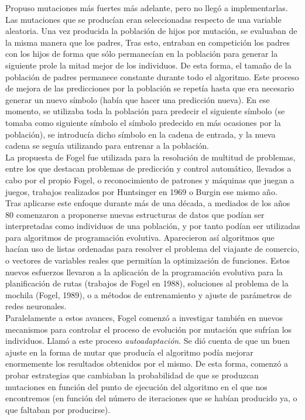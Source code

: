 \documentclass[12pt]{article} \usepackage[utf8]{inputenc}
\begin{document}
Propuso mutaciones más fuertes más adelante, pero no llegó a
implementarlas. Las mutaciones que se producían eran seleccionadas
respecto de una variable aleatoria. Una vez producida la población de
hijos por mutación, se evaluaban de la misma manera que los padres,
Tras esto, entraban en competición los padres con los hijos de forma
que sólo permanecían en la población para generar la siguiente prole
la mitad mejor de los individuos. De esta forma, el tamaño de la
población de padres permanece constante durante todo el algoritmo.
Este proceso de mejora de las predicciones por la población se repetía
hasta que era necesario generar un nuevo símbolo (había que hacer una
predicción nueva). En ese momento, se utilizaba toda la población para
predecir el siguiente símbolo (se tomaba como siguiente símbolo el
símbolo predecido en más ocasiones por la población), se introducía
dicho símbolo en la cadena de entrada, y la nueva cadena se seguía
utilizando para entrenar a la población.\\

La propuesta de Fogel fue utilizada para la resolución de multitud de
problemas, entre los que destacan problemas de predicción y control
automático, llevados a cabo por el propio Fogel, o reconocimiento de
patrones y máquinas que juegan a juegos, trabajos realizados por
Huntsinger en 1969 o Burgin ese mismo año.\\

Tras aplicarse este enfoque durante más de una década, a mediados de
los años 80 comenzaron a proponerse nuevas estructuras de datos que
podían ser interpretadas como individuos de una población, y por tanto
podían ser utilizadas para algoritmos de programación
evolutiva. Aparecieron así algoritmos que hacían uso de listas
ordenadas para resolver el problema del viajante de comercio, o
vectores de variables reales que permitían la optimización de
funciones. Estos nuevos esfuerzos llevaron a la aplicación de la
programación evolutiva para la planificación de rutas (trabajos de
Fogel en 1988), soluciones al problema de la mochila (Fogel, 1989), o
a métodos de entrenamiento y ajuste de parámetros de redes neuronales.\\

Paralelamente a estos avances, Fogel comenzó a investigar también en
nuevos mecanismos para controlar el proceso de evolución por mutación
que sufrían los individuos. Llamó a este proceso
\textit{autoadaptación}.  Se dió cuenta de que un buen ajuste en la
forma de mutar que producía el algoritmo podía mejorar enormemente los
resultados obtenidos por el mismo. De esta forma, comenzó a probar
estrategias que cambiaban la probabilidad de que se produzcan
mutaciones en función del punto de ejecución del algoritmo en el que
nos encontremos (en función del número de iteraciones que se habían
producido ya, o que faltaban por producirse).\\
\end{document}
